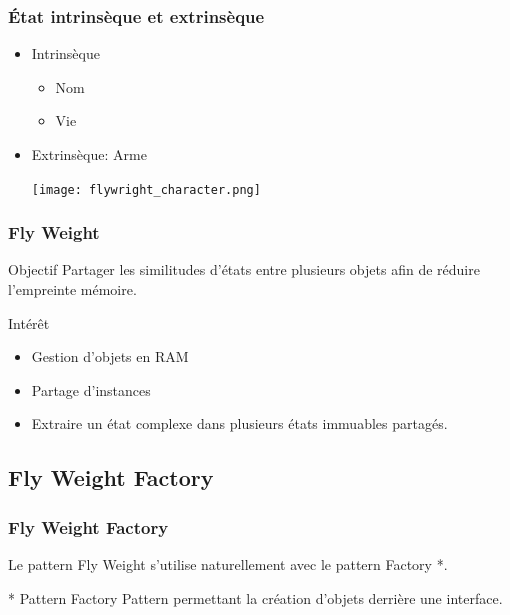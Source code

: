 \documentclass{beamer}
\begin{document}
\begin{frame}
\frametitle{État intrinsèque et extrinsèque}

\begin{itemize}

    \item Intrinsèque
        \begin{itemize}
            \item Nom
            \item Vie
        \end{itemize}

    \item
        \begin{minipage}[c]{0.5\linewidth}
        Extrinsèque: Arme
        \end{minipage}
        \begin{minipage}[c]{0.3\linewidth}
        \centering
        \strut\vspace*{-\baselineskip}\newline\texttt{[image: flywright\_character.png]}
        \end{minipage}

\end{itemize}
\end{frame}

\begin{frame}
\frametitle{Fly Weight}

    \begin{block}{Objectif}
    Partager les similitudes d'états entre plusieurs objets afin de réduire l'empreinte mémoire.
    \end{block}

    \begin{block}{Intérêt}
    \begin{itemize}
    \item Gestion d'objets en RAM
    \item Partage d'instances
    \item Extraire un état complexe dans plusieurs états immuables partagés.
    \end{itemize}
    \end{block}
\end{frame}


\subsection{Fly Weight Factory}
\begin{frame}
\frametitle{Fly Weight Factory}
Le pattern Fly Weight s'utilise naturellement avec le pattern Factory *.

\begin{block}{* Pattern Factory}
Pattern permettant la création d'objets derrière une interface.
\end{block}

\end{frame}
\end{document}

